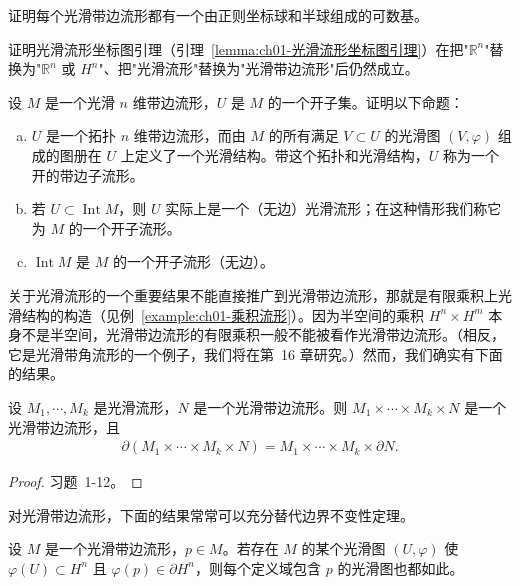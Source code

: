 \documentclass[../../main.tex]{subfiles}
\begin{document}
\begin{exercise}\label{exercise:ch01-1.42}
证明每个光滑带边流形都有一个由正则坐标球和半球组成的可数基。
\end{exercise}

\begin{exercise}\label{exercise:ch01-1.43}
证明光滑流形坐标图引理（引理~\cref{lemma:ch01-光滑流形坐标图引理}）在把"$\mathbb{R}^{n}$"替换为"$\mathbb{R}^{n}$ 或 $H^{n}$"、把"光滑流形"替换为"光滑带边流形"后仍然成立。
\end{exercise}

\begin{exercise}\label{exercise:ch01-1.44}
设 $M$ 是一个光滑 $n$ 维带边流形，$U$ 是 $M$ 的一个开子集。证明以下命题：
\begin{enumerate}[(a)]
\item $U$ 是一个拓扑 $n$ 维带边流形，而由 $M$ 的所有满足 $V\subset U$ 的光滑图 $(V,\varphi)$ 组成的图册在 $U$ 上定义了一个光滑结构。带这个拓扑和光滑结构，$U$ 称为一个开的带边子流形。
\item 若 $U\subset\operatorname{Int}M$，则 $U$ 实际上是一个（无边）光滑流形；在这种情形我们称它为 $M$ 的一个开子流形。
\item $\operatorname{Int}M$ 是 $M$ 的一个开子流形（无边）。
\end{enumerate}
\end{exercise}

关于光滑流形的一个重要结果不能直接推广到光滑带边流形，那就是有限乘积上光滑结构的构造（见例~\cref{example:ch01-乘积流形}）。因为半空间的乘积 $H^{n}\times H^{m}$ 本身不是半空间，光滑带边流形的有限乘积一般不能被看作光滑带边流形。（相反，它是光滑带角流形的一个例子，我们将在第~16 章研究。）然而，我们确实有下面的结果。

\begin{proposition}\label{proposition:ch01-乘积带边}
设 $M_{1},\cdots ,M_{k}$ 是光滑流形，$N$ 是一个光滑带边流形。则 $M_{1}\times\cdots\times M_{k}\times N$ 是一个光滑带边流形，且
\begin{align*}
\partial(M_{1}\times\cdots\times M_{k}\times N)=M_{1}\times\cdots\times M_{k}\times\partial N.
\end{align*}
\end{proposition}

\begin{proof}
习题~1-12。
\end{proof}

对光滑带边流形，下面的结果常常可以充分替代边界不变性定理。

\begin{theorem}[边界的光滑不变性]\label{theorem:ch01-边界光滑不变性}
设 $M$ 是一个光滑带边流形，$p\in M$。若存在 $M$ 的某个光滑图 $(U,\varphi)$ 使 $\varphi(U)\subset H^{n}$ 且 $\varphi(p)\in\partial H^{n}$，则每个定义域包含 $p$ 的光滑图也都如此。
\end{theorem}
\end{document}
